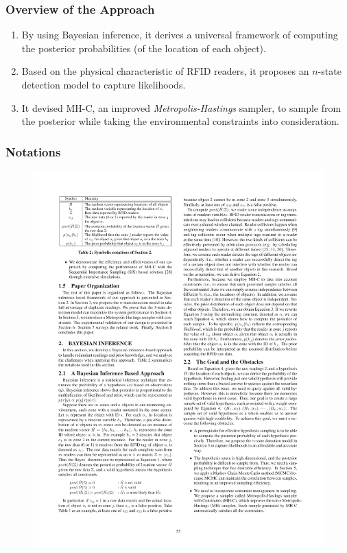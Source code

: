 
\begin{frame}
\frametitle{Overview of the Approach}

\begin{enumerate}
  \item By using Bayesian inference, it derives a universal framework of computing the posterior probabilities (of the location of each object).
  \item Based on the physical characteristic of RFID readers, it proposes an $n$-state detection model to capture likelihoods.
  \item It devised MH-C, an improved \emph{Metropolis-Hastings} sampler, to sample from the posterior while taking the environmental constraints into consideration.
\end{enumerate}

\end{frame}


\begin{frame}
\frametitle{Notations}

\begin{figure}[tb]
  \includegraphics[width=\columnwidth]{figures/3-1/3-1-3.pdf}
\end{figure}

\end{frame}

